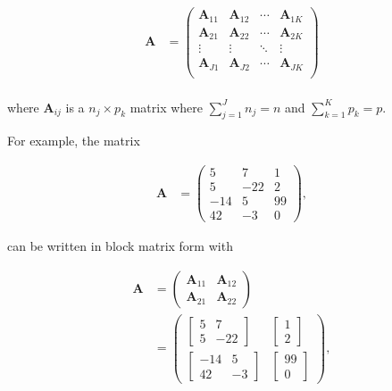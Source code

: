 \documentclass[
]{book}
\theoremstyle{definition}
\theoremstyle{definition}
\theoremstyle{definition}
\theoremstyle{remark}
\begin{document}
\[
\begin{aligned}
\mathbf{A} & = \begin{pmatrix} \mathbf{A}_{11} & \mathbf{A}_{12} & \cdots & \mathbf{A}_{1K} \\
\mathbf{A}_{21} & \mathbf{A}_{22} &  \cdots & \mathbf{A}_{2K} \\
\vdots & \vdots & \ddots & \vdots \\
\mathbf{A}_{J1} & \mathbf{A}_{J2} & \cdots & \mathbf{A}_{JK} \\
\end{pmatrix} \\
\end{aligned}
\]

where \(\mathbf{A}_{ij}\) is a \(n_j \times p_k\) matrix where \(\sum_{j=1}^J n_j = n\) and \(\sum_{k=1}^K p_k = p\).

For example, the matrix

\[
\begin{aligned}
\mathbf{A} & = \begin{pmatrix} 5 & 7 & 1 \\
5 & -22  & 2 \\
-14 & 5 & 99 \\
42 & -3 & 0\end{pmatrix},
\end{aligned}
\]

can be written in block matrix form with

\[
\begin{aligned}
\mathbf{A} & =
\begin{pmatrix} \mathbf{A}_{11} & \mathbf{A}_{12} \\
\mathbf{A}_{21} & \mathbf{A}_{22} \end{pmatrix} \\
& = \begin{pmatrix} \begin{bmatrix} 5 & 7 \\
5 & -22 \end{bmatrix} &
\begin{bmatrix} 1 \\
2 \end{bmatrix} \\
\begin{bmatrix}
-14 & 5 \\
42 & -3
\end{bmatrix} &
\begin{bmatrix} 99 \\ 0 \end{bmatrix}
\end{pmatrix},
\end{aligned}
\]
\end{document}
